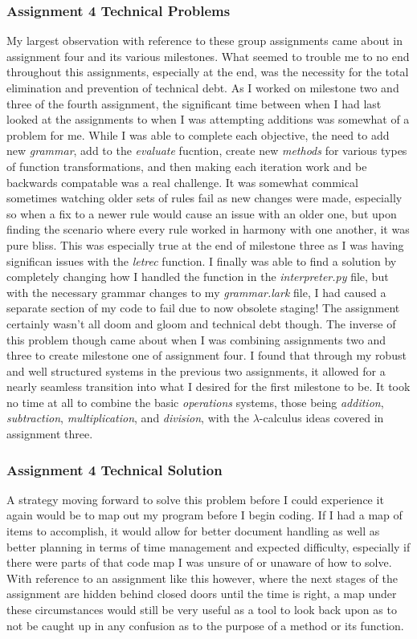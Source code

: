 \documentclass{article}
\theoremstyle{theorem}
\theoremstyle{definition}
\theoremstyle{remark}
\begin{document}
  \subsubsection*{Assignment 4 Technical Problems}
  My largest  observation with reference to these group assignments came about in assignment four and 
  its various milestones. What seemed to trouble me to no end throughout this assignments, especially at the end,  
  was the necessity for the total elimination and prevention of technical debt. As I worked on milestone two 
  and three of the fourth assignment, the significant time between when I had last looked at the assignments 
  to when I was attempting additions was somewhat of a problem for me. While I was able to complete each 
  objective, the need to add new \emph{grammar}, add to the \emph{evaluate} fucntion, create new \emph{methods} 
  for various types of function transformations, and then making each iteration work and be backwards 
  compatable was a real challenge. It was somewhat commical sometimes watching older sets of rules fail 
  as new changes were made, especially so when a fix to a newer rule would cause an issue with an older one, 
  but upon finding the scenario where every rule worked in harmony with one another, it was pure bliss. 
  This was especially true at the end of milestone three as I was having significan issues with the 
  \emph{letrec} function. I finally was able to find a solution by completely changing how I handled the 
  function in the \emph{interpreter.py} file, but with the necessary grammar changes to my \emph{grammar.lark} 
  file, I had caused a separate section of my code to fail due to now obsolete staging! The assignment certainly 
  wasn't all doom and gloom and technical debt though. The inverse of this problem though came about when I was combining 
  assignments two and three to create milestone one of assignment four. I found that through my robust and well 
  structured systems in the previous two assignments, it allowed for a nearly seamless transition into what I desired 
  for the first milestone to be. It took no time at all to combine the basic \emph{operations} systems, those 
  being \emph{addition}, \emph{subtraction}, \emph{multiplication}, and \emph{division}, with the $\lambda$-calculus 
  ideas covered in assignment three.  

  \subsubsection*{Assignment 4 Technical Solution}
  A strategy moving forward to solve this problem before I could experience it again would be to map out my 
  program before I begin coding. If I had a map of items to accomplish, it would allow for better document 
  handling as well as better planning in terms of time management and expected difficulty, especially if there 
  were parts of that code map I was unsure of or unaware of how to solve. With reference to an assignment like
  this however, where the next stages of the assignment are hidden behind closed doors until the time is right, 
  a map under these circumstances would still be very useful as a tool to look back upon as to not be caught up 
  in any confusion as to the purpose of a method or its function.
\end{document}
